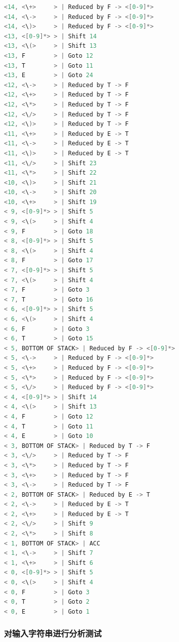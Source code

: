 \begin{lstlisting}[language=c++]
<14, <\+>     > | Reduced by F -> <[0-9]*>
<14, <\->     > | Reduced by F -> <[0-9]*>
<14, <\)>     > | Reduced by F -> <[0-9]*>
<13, <[0-9]*> > | Shift 14
<13, <\(>     > | Shift 13
<13, F        > | Goto 12
<13, T        > | Goto 11
<13, E        > | Goto 24
<12, <\->     > | Reduced by T -> F
<12, <\+>     > | Reduced by T -> F
<12, <\*>     > | Reduced by T -> F
<12, <\/>     > | Reduced by T -> F
<12, <\)>     > | Reduced by T -> F
<11, <\+>     > | Reduced by E -> T
<11, <\->     > | Reduced by E -> T
<11, <\)>     > | Reduced by E -> T
<11, <\/>     > | Shift 23
<11, <\*>     > | Shift 22
<10, <\)>     > | Shift 21
<10, <\->     > | Shift 20
<10, <\+>     > | Shift 19
< 9, <[0-9]*> > | Shift 5
< 9, <\(>     > | Shift 4
< 9, F        > | Goto 18
< 8, <[0-9]*> > | Shift 5
< 8, <\(>     > | Shift 4
< 8, F        > | Goto 17
< 7, <[0-9]*> > | Shift 5
< 7, <\(>     > | Shift 4
< 7, F        > | Goto 3
< 7, T        > | Goto 16
< 6, <[0-9]*> > | Shift 5
< 6, <\(>     > | Shift 4
< 6, F        > | Goto 3
< 6, T        > | Goto 15
< 5, BOTTOM OF STACK> | Reduced by F -> <[0-9]*>
< 5, <\->     > | Reduced by F -> <[0-9]*>
< 5, <\+>     > | Reduced by F -> <[0-9]*>
< 5, <\*>     > | Reduced by F -> <[0-9]*>
< 5, <\/>     > | Reduced by F -> <[0-9]*>
< 4, <[0-9]*> > | Shift 14
< 4, <\(>     > | Shift 13
< 4, F        > | Goto 12
< 4, T        > | Goto 11
< 4, E        > | Goto 10
< 3, BOTTOM OF STACK> | Reduced by T -> F
< 3, <\/>     > | Reduced by T -> F
< 3, <\*>     > | Reduced by T -> F
< 3, <\+>     > | Reduced by T -> F
< 3, <\->     > | Reduced by T -> F
< 2, BOTTOM OF STACK> | Reduced by E -> T
< 2, <\->     > | Reduced by E -> T
< 2, <\+>     > | Reduced by E -> T
< 2, <\/>     > | Shift 9
< 2, <\*>     > | Shift 8
< 1, BOTTOM OF STACK> | ACC
< 1, <\->     > | Shift 7
< 1, <\+>     > | Shift 6
< 0, <[0-9]*> > | Shift 5
< 0, <\(>     > | Shift 4
< 0, F        > | Goto 3
< 0, T        > | Goto 2
< 0, E        > | Goto 1
\end{lstlisting}

\subsubsection{对输入字符串进行分析测试}


